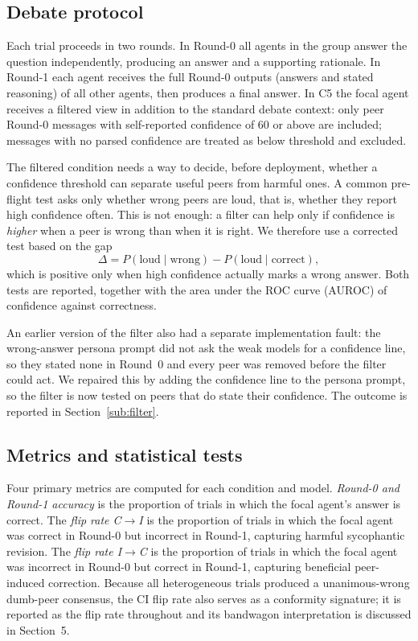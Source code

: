 \documentclass[11pt]{article}
\begin{document}
\subsection{Debate protocol}
\label{sub:protocol}

Each trial proceeds in two rounds.
In Round-0 all agents in the group answer the question independently,
producing an answer and a supporting rationale.
In Round-1 each agent receives the full Round-0 outputs (answers and
stated reasoning) of all other agents, then produces a final answer.
In C5 the focal agent receives a filtered view in addition to the
standard debate context: only peer Round-0 messages with self-reported
confidence of 60 or above are included; messages with no parsed
confidence are treated as below threshold and excluded.

The filtered condition needs a way to decide, before deployment, whether a
confidence threshold can separate useful peers from harmful ones.
A common pre-flight test asks only whether wrong peers are loud, that is,
whether they report high confidence often.
This is not enough: a filter can help only if confidence is \emph{higher}
when a peer is wrong than when it is right.
We therefore use a corrected test based on the gap
\[
\Delta = P(\text{loud}\mid\text{wrong}) - P(\text{loud}\mid\text{correct}),
\]
which is positive only when high confidence actually marks a wrong answer.
Both tests are reported, together with the area under the ROC curve
(AUROC) of confidence against correctness.

An earlier version of the filter also had a separate implementation fault:
the wrong-answer persona prompt did not ask the weak models for a
confidence line, so they stated none in Round~0 and every peer was removed
before the filter could act.
We repaired this by adding the confidence line to the persona prompt, so
the filter is now tested on peers that do state their confidence.
The outcome is reported in Section~\ref{sub:filter}.

\subsection{Metrics and statistical tests}
\label{sub:stats}

Four primary metrics are computed for each condition and model.
\textit{Round-0 and Round-1 accuracy} is the proportion of trials in which
the focal agent's answer is correct.
The \textit{flip rate C$\rightarrow$I} is the proportion of trials in which
the focal agent was correct in Round-0 but incorrect in Round-1, capturing
harmful sycophantic revision.
The \textit{flip rate I$\rightarrow$C} is the proportion of trials in which
the focal agent was incorrect in Round-0 but correct in Round-1, capturing
beneficial peer-induced correction.
Because all heterogeneous trials produced a unanimous-wrong dumb-peer
consensus, the C\textrightarrow{}I flip rate also serves as a conformity
signature; it is reported as the flip rate throughout and its bandwagon
interpretation is discussed in Section~5.
\end{document}

